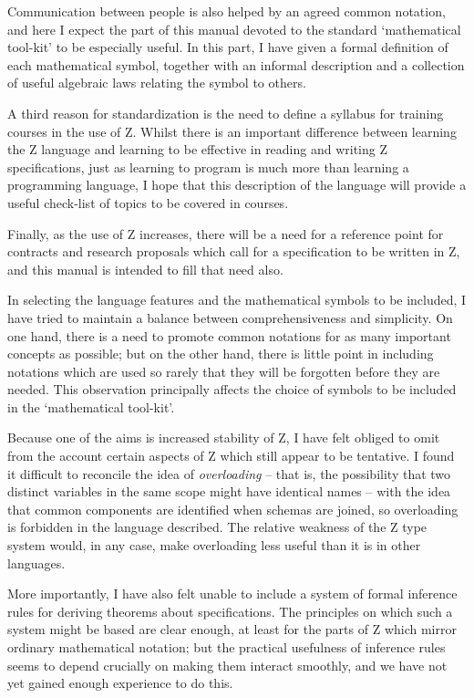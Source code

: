 Communication between people is also helped by an agreed common
notation, and here I expect the part of this manual devoted to
the standard `mathematical tool-kit' to be especially useful. In
this part, I have given a formal definition of each mathematical
symbol, together with an informal description and a collection
of useful algebraic laws relating the symbol to others.

A third reason for standardization is the need to define a syllabus
for training courses in the use of Z.  Whilst
there is an important difference between learning the Z language and
learning to be effective in reading and writing Z specifications, just
as learning to program is much more than learning a programming
language, I hope that this description of the language will provide a
useful check-list of topics to be covered in courses.

Finally, as the use of Z increases, there will be a need for a
reference point for contracts and research proposals which call
for a specification to be written in Z, and this manual is intended
to fill that need also.

In selecting the language features and the mathematical symbols to be
included, I have tried to maintain a balance between
comprehensiveness and simplicity. On one hand, there is a need to promote
common notations for as many important concepts as possible; but on the
other hand, there is little point in including notations which are used
so rarely that they will be forgotten before they are needed. This
observation principally affects the choice of symbols to be included in
the `mathematical tool-kit'.

Because one of the aims is increased stability of Z, I have felt
obliged to omit from the account certain aspects of Z which still
appear to be tentative. I found it difficult to reconcile the idea of
{\em overloading\/} -- that is, the
possibility that two distinct variables in the same scope might have
identical names -- with the idea that common components are
identified when schemas are joined, so overloading is forbidden in
the language described.  The relative weakness of the Z type system
would, in any case, make overloading less useful than it is in other
languages.

More importantly, I have also felt unable to include a system of
formal inference rules for deriving theorems
about specifications.  The principles on which such a system might be
based are clear enough, at least for the parts of Z which mirror
ordinary mathematical notation; but the practical usefulness of
inference rules seems to depend crucially on making them interact
smoothly, and we have not yet gained enough experience to do this.

